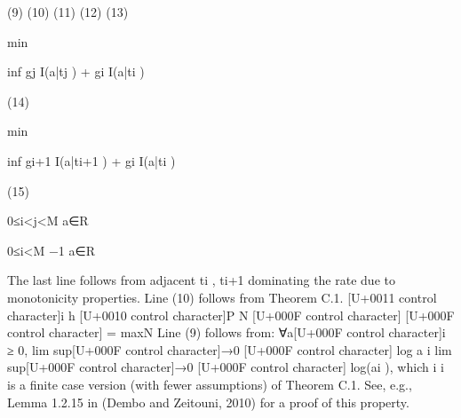 \documentclass[10pt]{article}
\begin{document}
\begin{ReviewVerbatim}
(9)
(10)
(11)
(12)
(13)

min

inf {gj I(a|tj ) + gi I(a|ti )}

(14)

min

inf {gi+1 I(a|ti+1 ) + gi I(a|ti )}

(15)

0≤i<j<M a∈R

0≤i<M −1 a∈R

The last line follows from adjacent ti , ti+1 dominating the rate due to monotonicity properties.
Line (10) follows from Theorem C.1.
[U+0011 control character]i
h
[U+0010 control character]P
N [U+000F control character]
[U+000F control character]
= maxN
Line (9) follows from: ∀a[U+000F control character]i ≥ 0, lim sup[U+000F control character]→0 [U+000F control character] log
a
i lim sup[U+000F control character]→0 [U+000F control character] log(ai ), which
i
i
is a finite case version (with fewer assumptions) of Theorem C.1. See, e.g., Lemma 1.2.15 in (Dembo
and Zeitouni, 2010) for a proof of this property.
\end{ReviewVerbatim}
\end{document}
